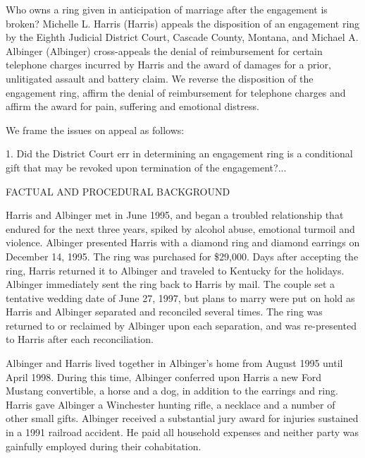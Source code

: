 

Who owns a ring given in anticipation of marriage after the engagement is
broken? Michelle L. Harris (Harris) appeals the disposition of an engagement
ring by the Eighth Judicial District Court, Cascade County, Montana, and
Michael A. Albinger (Albinger) cross-appeals the denial of reimbursement for
certain telephone charges incurred by Harris and the award of damages for a
prior, unlitigated assault and battery claim. We reverse the disposition of the
engagement ring, affirm the denial of reimbursement for telephone charges and
affirm the award for pain, suffering and emotional distress. 

We frame the issues on appeal as follows: 

1. Did the District Court err in determining an engagement ring is a conditional
gift that may be revoked upon termination of the engagement?...

{\centering\scshape
\textup{FACTUAL AND PROCEDURAL BACKGROUND}
\par}

Harris and Albinger met in June 1995, and began a troubled relationship that
endured for the next three years, spiked by alcohol abuse, emotional turmoil
and violence. Albinger presented Harris with a diamond ring and diamond
earrings on December 14, 1995. The ring was purchased for \$29,000. Days after
accepting the ring, Harris returned it to Albinger and traveled to Kentucky for
the holidays. Albinger immediately sent the ring back to Harris by mail. The
couple set a tentative wedding date of June 27, 1997, but plans to marry were
put on hold as Harris and Albinger separated and reconciled several times. The
ring was returned to or reclaimed by Albinger upon each separation, and was
re-presented to Harris after each reconciliation. 

Albinger and Harris lived together in Albinger's home from August 1995 until
April 1998. During this time, Albinger conferred upon Harris a new Ford Mustang
convertible, a horse and a dog, in addition to the earrings and ring. Harris
gave Albinger a Winchester hunting rifle, a necklace and a number of other
small gifts. Albinger received a substantial jury award for injuries sustained
in a 1991 railroad accident. He paid all household expenses and neither party
was gainfully employed during their cohabitation. 

